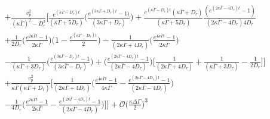 \documentclass[]{article}
\begin{document}
\begin{equation}
\begin{split}
\\
+\frac{v_p^2}{(\kappa \bar \Gamma)^2-D_r^2}\bigg [\frac{e^{(\kappa \bar \Gamma-D_r)t}}{(\kappa \bar \Gamma+5D_r)}\bigg(\frac{e^{(3\kappa \bar \Gamma+D_r)t}-1)}{(3\kappa \bar \Gamma+D_r)}\bigg)
+\frac{e^{(\kappa \bar \Gamma-D_r)t}(\kappa \bar \Gamma+D_r)}{(\kappa \bar \Gamma+5D_r)}\frac{(e^{(2\kappa \bar \Gamma-4D_r)t}-1)}{(2\kappa \bar \Gamma-4D_r)4D_r}
\\+\frac{1}{2D_r}\bigg(\frac{e^{2\kappa \bar \Gamma t}-1}{2\kappa \bar \Gamma}\bigg)\bigg(1-\frac{e^{(\kappa \bar \Gamma-D_r)t}}{2}\bigg)-\frac{1}{(2\kappa \bar \Gamma +4D_r)}\bigg(\frac{e^{4\kappa \bar \Gamma t}-1}{2\kappa \bar \Gamma}\bigg)\\-\frac{1}{(\kappa \bar \Gamma +3D_r)}\bigg(\frac{e^{(3\kappa \bar \Gamma-D_r) t}-1}{(3\kappa \bar \Gamma-D_r)}\bigg)+\bigg(\frac{e^{(2\kappa \bar \Gamma-4D_r)t}-1}{(2\kappa \bar \Gamma-4D_r)}\bigg)\bigg[\frac{1}{(2\kappa \bar \Gamma +4D_r)}+\frac{1}{(\kappa \bar \Gamma +3D_r)}-\frac{1}{2D_r}\bigg]\Bigg]
\\+\frac{v_p^2}{\kappa \bar \Gamma(\kappa \bar \Gamma+D_r)}\bigg[\frac{1}{(2\kappa \bar \Gamma+4D_r )}\bigg(\frac{e^{4\kappa \bar \Gamma t}-1}{4\kappa \bar \Gamma}-\frac{e^{(2\kappa \bar \Gamma-4D_r)t}-1}{(2\kappa \bar \Gamma-4D_r)}\bigg)\\-\frac{1}{4D_r}\bigg(\frac{e^{2\kappa \bar \Gamma t}-1}{2\kappa \bar \Gamma}-\frac{e^{(2\kappa \bar \Gamma-4D_r)t}-1}{(2\kappa \bar \Gamma-4D_r)}\bigg)\bigg]\Bigg]+\mathcal{O}\bigg(\frac{\kappa \Delta \Gamma }{2}\bigg)^3
\end{split}
\end{equation}
\end{document}

